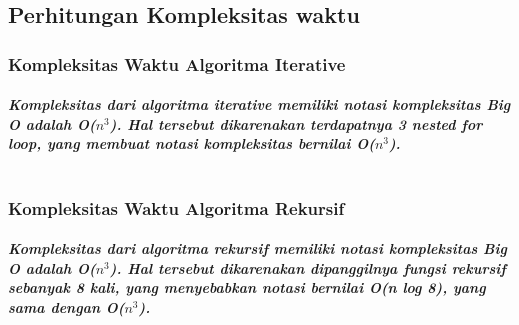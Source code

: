 \documentclass[conference]{IEEEtran}
\begin{document}
\subsection{Perhitungan Kompleksitas waktu}
\subsubsection{Kompleksitas Waktu Algoritma Iterative}
\paragraph*{
    \emph{Kompleksitas dari algoritma iterative memiliki notasi kompleksitas Big O adalah O($n^{3}$). 
    Hal tersebut dikarenakan terdapatnya 3 nested for loop, yang membuat notasi kompleksitas
    bernilai O($n^{3}$).\\\\}
}


\subsubsection{Kompleksitas Waktu Algoritma Rekursif}
\paragraph*{
    \emph{Kompleksitas dari algoritma rekursif memiliki notasi kompleksitas Big O adalah O($n^{3}$). 
    Hal tersebut dikarenakan dipanggilnya fungsi rekursif sebanyak 8 kali, yang menyebabkan 
    notasi bernilai O(n log 8), yang sama dengan O($n^{3}$).\\\\}
}

\end{document}
